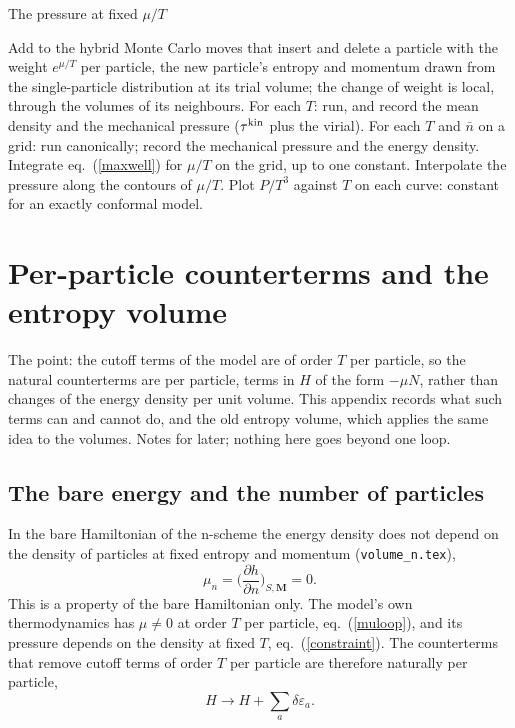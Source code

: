 \documentclass[11pt,aps,preprint,nofootinbib,superscriptaddress,tightenlines]{revtex4-2}
\def\st{\begin{equation}}
\def\stp{\end{equation}}
\def\Eq#1{eq.~(\ref{#1})}
\begin{document}
\begin{algobox}{The pressure at fixed $\mu/T$}
\begin{algorithmic}[1]
  \State Add to the hybrid Monte Carlo moves that insert and delete a particle with the weight $e^{\mu/T}$ per particle, the new particle's entropy and
  momentum drawn from the single-particle distribution at its trial volume; the change of weight is local, through the volumes of its neighbours.
  \State For each $T$: run, and record the mean density and the mechanical pressure ($\tau^{\rm kin}$ plus the virial).
\Else
  \State For each $T$ and $\bar n$ on a grid: run canonically; record the mechanical pressure and the energy density.
  \State Integrate \Eq{maxwell} for $\mu/T$ on the grid, up to one constant.
  \State Interpolate the pressure along the contours of $\mu/T$.
\EndIf
\State Plot $P/T^3$ against $T$ on each curve: constant for an exactly conformal model.
\end{algorithmic}
\end{algobox}

\appendix

\section{Per-particle counterterms and the entropy volume}
\label{app:entropyvolume}

The point: the cutoff terms of the model are of order $T$ per particle, so the natural counterterms are per particle, terms in $H$ of the form $-\mu N$,
rather than changes of the energy density per unit volume.  This appendix records what such terms can and cannot do, and the old entropy volume, which applies
the same idea to the volumes.  Notes for later; nothing here goes beyond one loop.

\subsection{The bare energy and the number of particles}

In the bare Hamiltonian of the n-scheme the energy density does not depend on the density of particles at fixed entropy and momentum (\texttt{volume\_n.tex}),
\st
\mu_n=\Big(\frac{\partial h}{\partial n}\Big)_{S,\bm M}=0 .
\stp
This is a property of the bare Hamiltonian only.  The model's own thermodynamics has $\mu\neq0$ at order $T$ per particle, \Eq{muloop}, and its pressure
depends on the density at fixed $T$, \Eq{constraint}.  The counterterms that remove cutoff terms of order $T$ per particle are therefore naturally per particle,
\st
H\to H+\sum_a\delta\varepsilon_a .
\stp
\end{document}

